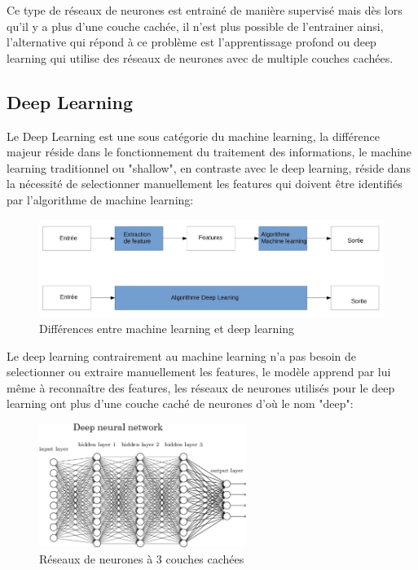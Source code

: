 Ce type de réseaux de neurones est entrainé de manière supervisé mais dès lors qu'il 
y a plus d'une couche cachée, il n'est plus possible de l'entrainer ainsi,
l'alternative qui répond à ce problème est l'apprentissage profond ou 
deep learning qui utilise des réseaux de neurones avec de multiple couches 
cachées.  


\subsection{Deep Learning}
Le Deep Learning est une sous catégorie du machine learning, 
la différence majeur réside dans le fonctionnement du traitement des 
informations, le machine learning traditionnel ou "shallow", en contraste avec le deep 
learning, réside dans la nécessité de selectionner manuellement les features 
qui doivent être identifiés par l'algorithme de machine learning:

\begin{figure}[!h]
    \centering
    \includegraphics[width=1\textwidth]{Images/MLvsDL}
    \caption{Différences entre machine learning et deep learning}
	\label{fig:DiffMLDL}
\end{figure}

Le deep learning contrairement au machine learning n'a pas besoin de selectionner 
ou extraire manuellement les features, le modèle apprend par lui même à reconnaître 
des features, les réseaux de neurones utilisés pour le deep learning 
ont plus d'une couche caché de neurones d'où le nom "deep": \newline

\begin{figure}[!h]
    \centering
    \includegraphics[width=0.6\textwidth]{Images/deepnn}
    \caption{Réseaux de neurones à 3 couches cachées}
	\label{fig:deepneuralnetwork}
\end{figure}
\newpage



